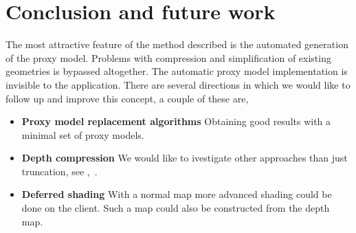 \section{Conclusion and future work}

The most attractive feature of the method described is the automated generation
of the proxy model. Problems with compression and simplification of existing
geometries is bypassed altogether. The automatic proxy model implementation is
invisible to the application. There are several directions in which we would
like to follow up and improve this concept, a couple of these are,
\begin{itemize}

\item \textbf{Proxy model replacement algorithms} Obtaining good results with a minimal set of
proxy models.

\item \textbf{Depth compression} We would like to ivestigate other approaches
than just truncation, see \eg,~\cite{DBLP:journals/tvcg/Lindstrom14}.

\item \textbf{Deferred shading} With a normal map more advanced
shading could be done on the client. Such a map could also be constructed from
the depth map.

\end{itemize}



%






